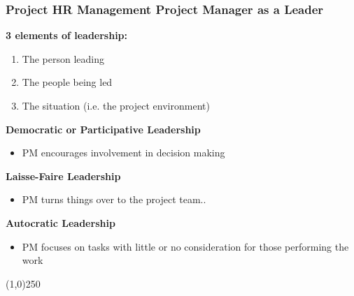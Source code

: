 
\begin{frame}
\frametitle{Project HR Management \hfill Project Manager as a Leader}
\textbf{3 elements of leadership:}
\begin{enumerate}
	\item The person leading
	\item The people being led
	\item The situation (i.e. the project environment)
\end{enumerate}
\textbf{Democratic or Participative Leadership}
\begin{itemize}
	\item PM encourages involvement in decision making
\end{itemize}
\textbf{Laisse-Faire Leadership}
\begin{itemize}
	\item PM turns things over to the project team.. 
\end{itemize}
\textbf{Autocratic Leadership}
\begin{itemize}
	\item PM focuses on tasks with little or no consideration for those performing the work
\end{itemize}
\end{frame}\begin{center}\line(1,0){250}\end{center}
 
